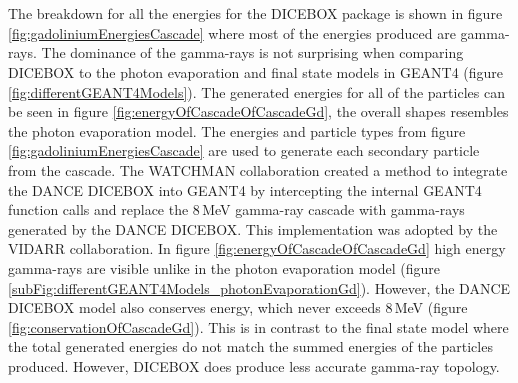 \\\\The breakdown for all the energies for the DICEBOX package is shown in figure \ref{fig:gadoliniumEnergiesCascade} where most of the energies produced are gamma-rays. The dominance of the gamma-rays is not surprising when comparing DICEBOX to the photon evaporation and final state models in GEANT4 (figure \ref{fig:differentGEANT4Models}). The generated energies for all of the particles can be seen in figure \ref{fig:energyOfCascadeOfCascadeGd}, the overall shapes resembles the photon evaporation model. The energies and particle types from figure \ref{fig:gadoliniumEnergiesCascade} are used to generate each secondary particle from the cascade. The WATCHMAN collaboration created a method to integrate the DANCE DICEBOX into GEANT4 by intercepting the internal GEANT4 function calls and replace the 8\,MeV gamma-ray cascade with gamma-rays generated by the DANCE DICEBOX. This implementation was adopted by the VIDARR collaboration. In figure \ref{fig:energyOfCascadeOfCascadeGd} high energy gamma-rays are visible unlike in the photon evaporation model (figure \ref{subFig:differentGEANT4Models_photonEvaporationGd}). However, the DANCE DICEBOX model also conserves energy, which never exceeds 8\,MeV (figure \ref{fig:conservationOfCascadeGd}). This is in contrast to the final state model where the total generated energies do not match the summed energies of the particles produced. However, DICEBOX does produce less accurate gamma-ray topology.

